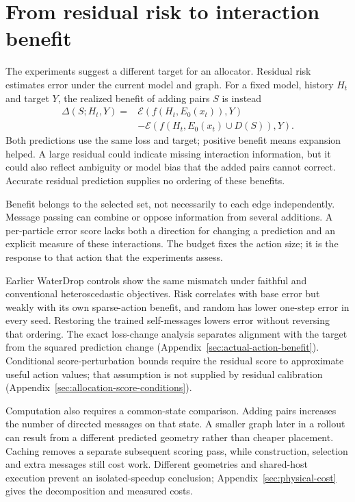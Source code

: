 \section{From residual risk to interaction benefit}
The experiments suggest a different target for an allocator. Residual risk estimates error under the current model and graph. For a fixed model, history $H_t$ and target $Y$, the realized benefit of adding pairs $S$ is instead
\begin{align}
 \Delta(S;H_t,Y)={}&\mathcal E(f(H_t,E_0(x_t)),Y)\nonumber\\
 &-\mathcal E(f(H_t,E_0(x_t)\cup D(S)),Y).
 \label{eq:intervention-benefit}
\end{align}
Both predictions use the same loss and target; positive benefit means expansion helped. A large residual could indicate missing interaction information, but it could also reflect ambiguity or model bias that the added pairs cannot correct. Accurate residual prediction supplies no ordering of these benefits.

Benefit belongs to the selected set, not necessarily to each edge independently. Message passing can combine or oppose information from several additions. A per-particle error score lacks both a direction for changing a prediction and an explicit measure of these interactions. The budget fixes the action size; it is the response to that action that the experiments assess.

Earlier WaterDrop controls show the same mismatch under faithful and conventional heteroscedastic objectives. Risk correlates with base error but weakly with its own sparse-action benefit, and random has lower one-step error in every seed. Restoring the trained self-messages lowers error without reversing that ordering. The exact loss-change analysis separates alignment with the target from the squared prediction change (Appendix~\ref{sec:actual-action-benefit}). Conditional score-perturbation bounds require the residual score to approximate useful action values; that assumption is not supplied by residual calibration (Appendix~\ref{sec:allocation-score-conditions}).

Computation also requires a common-state comparison. Adding pairs increases the number of directed messages on that state. A smaller graph later in a rollout can result from a different predicted geometry rather than cheaper placement. Caching removes a separate subsequent scoring pass, while construction, selection and extra messages still cost work. Different geometries and shared-host execution prevent an isolated-speedup conclusion; Appendix~\ref{sec:physical-cost} gives the decomposition and measured costs.


